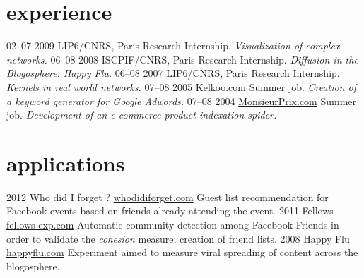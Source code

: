 \documentclass[print]{friggeri-cv}
\begin{document}
\section{experience}

\begin{entrylist}
  \entry
    {02–07 2009}
    {LIP6/CNRS, Paris}
    {Research Internship.}
    {\emph{Visualization of complex networks.}}
  \entry
    {06–08 2008}
    {ISCPIF/CNRS, Paris}
    {Research Internship.}
    {\emph{Diffusion in the Blogosphere. Happy Flu.}}
  \entry
    {06–08 2007}
    {LIP6/CNRS, Paris}
    {Research Internship.}
    {\emph{Kernels in real world networks.}}
  \entry
    {07–08 2005}
    {\href{http://www.kelkoo.com}{Kelkoo.com}}
    {Summer job.}
    {\emph{Creation of a keyword generator for Google Adwords.}}
  \entry
    {07–08 2004}
    {\href{http://www.monsieurprix.com}{MonsieurPrix.com}}
    {Summer job.}
    {\emph{Development of an e-commerce product indexation spider.}}
\end{entrylist}

\section{applications}

\begin{entrylist}
  \entry
    {2012}
    {Who did I forget ?}
    {\href{http://whodidiforget.com}{whodidiforget.com}}
    {Guest list recommendation for Facebook events based on friends already attending the event.}
  \entry
    {2011}
    {Fellows}
    {\href{http://fellows-exp.com}{fellows-exp.com}}
    {Automatic community detection among Facebook Friends in order to validate the \emph{cohesion} measure, creation of friend lists.}
  \entry
    {2008}
    {Happy Flu}
    {\href{http://happyflu.com}{happyflu.com}}
    {Experiment aimed to measure viral spreading of content across the blogosphere.}
\end{entrylist}
\end{document}
